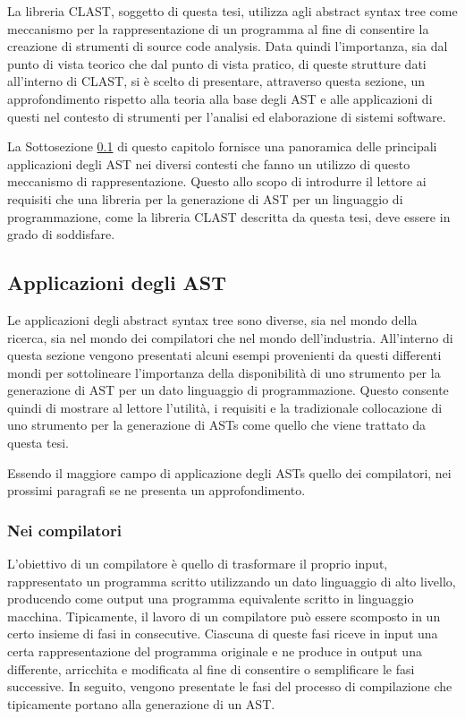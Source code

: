 La libreria CLAST, soggetto di questa tesi, utilizza agli abstract syntax tree
come meccanismo per la rappresentazione di un programma al fine di consentire la
creazione di strumenti di source code analysis. Data quindi l'importanza, sia
dal punto di vista teorico che dal punto di vista pratico, di queste strutture
dati all'interno di CLAST, si è scelto di presentare, attraverso questa sezione,
un approfondimento rispetto alla teoria alla base degli AST e alle applicazioni
di questi nel contesto di strumenti per l'analisi ed elaborazione di sistemi
software.

La Sottosezione \ref{ast-applications} di questo capitolo fornisce una
panoramica delle principali applicazioni degli AST nei diversi contesti che
fanno un utilizzo di questo meccanismo di rappresentazione. Questo allo scopo di
introdurre il lettore ai requisiti che una libreria per la generazione di AST
per un linguaggio di programmazione, come la libreria CLAST descritta da questa
tesi, deve essere in grado di soddisfare.

\subsection{Applicazioni degli AST}
\label{ast-applications}

Le applicazioni degli abstract syntax tree sono diverse, sia nel mondo della
ricerca, sia nel mondo dei compilatori che nel mondo dell’industria. All’interno
di questa sezione vengono presentati alcuni esempi provenienti da questi
differenti mondi per sottolineare l’importanza della disponibilità di uno
strumento per la generazione di AST per un dato linguaggio di programmazione.
Questo consente quindi di mostrare al lettore l’utilità, i requisiti e la
tradizionale collocazione di uno strumento per la generazione di ASTs come
quello che viene trattato da questa tesi.

Essendo il maggiore campo di applicazione degli ASTs quello dei compilatori, nei
prossimi paragrafi se ne presenta un approfondimento.

\subsubsection{Nei compilatori}

L'obiettivo di un compilatore è quello di trasformare il proprio input,
rappresentato un programma scritto utilizzando un dato linguaggio di alto
livello, producendo come output una programma equivalente scritto in linguaggio
macchina. Tipicamente, il lavoro di un compilatore può essere scomposto in un
certo insieme di fasi in consecutive. Ciascuna di queste fasi riceve in input
una certa rappresentazione del programma originale e ne produce in output una
differente, arricchita e modificata al fine di consentire o semplificare le fasi
successive. In seguito, vengono presentate le fasi del processo di compilazione
che tipicamente portano alla generazione di un AST.

